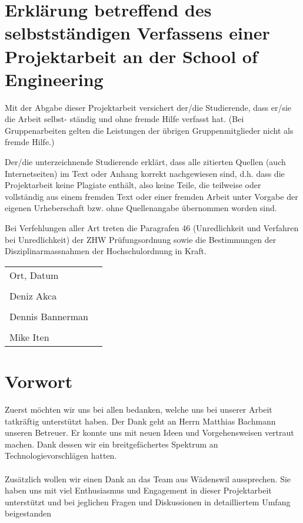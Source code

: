 \documentclass[../main.tex]{subfiles}
\begin{document}
	
	\section*{Erklärung betreffend des selbstständigen Verfassens einer Projektarbeit an der School of Engineering}
	
	Mit der Abgabe dieser Projektarbeit versichert der/die Studierende, dass er/sie die Arbeit selbst-
	ständig und ohne fremde Hilfe verfasst hat. (Bei Gruppenarbeiten gelten die Leistungen der übrigen
	Gruppenmitglieder nicht als fremde Hilfe.)\vspace{5mm}
	
	Der/die unterzeichnende Studierende erklärt, dass alle zitierten Quellen (auch Internetseiten) im Text
	oder Anhang korrekt nachgewiesen sind, d.h. dass die Projektarbeit keine Plagiate enthält, also keine
	Teile, die teilweise oder vollständig aus einem fremden Text oder einer fremden Arbeit unter Vorgabe der
	eigenen Urheberschaft bzw. ohne Quellenangabe übernommen worden sind.\vspace{5mm}
	
	Bei Verfehlungen aller Art treten die Paragrafen 46 (Unredlichkeit und Verfahren bei Unredlichkeit) der
	ZHW Prüfungsordnung sowie die Bestimmungen der Disziplinarmassnahmen der Hochschulordnung in
	Kraft.\vspace{15mm}
	
	\noindent\begin{tabular}{@{}p{2.5in}p{2.5in}@{}}
		Ort, Datum                       & \dotfill\\
		\\
		Deniz Akca                       & \dotfill\\
		\\
		Dennis Bannerman                 & \dotfill\\
		\\
		Mike Iten                        & \dotfill\\
	\end{tabular} 
	
	\newpage
	
	\section{Vorwort}
	Zuerst möchten wir uns bei allen bedanken, welche uns bei unserer Arbeit tatkräftig unterstützt haben. Der Dank geht an Herrn Matthias Bachmann unseren Betreuer. Er konnte uns mit neuen Ideen und Vorgehensweisen vertraut machen. Dank dessen wir ein breitgefächertes Spektrum an Technologievorschlägen hatten. \\
	\\
	Zusätzlich wollen wir einen Dank an das Team aus Wädenswil aussprechen. Sie haben uns mit viel Enthusiasmus und Engagement in dieser Projektarbeit unterstützt und bei jeglichen Fragen und Diskussionen in detailliertem Umfang beigestanden
	
\end{document}
